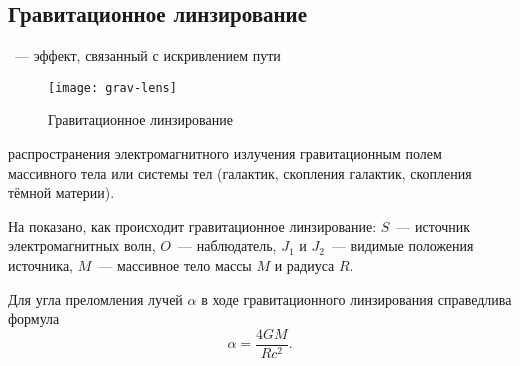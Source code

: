 \subsection{Гравитационное линзирование}
~--- эффект, связанный с искривлением пути
\begin{wrapfigure}[9]{l}{0.35\tw}
    \centering
    \vspace{-1pc}
    \texttt{[image: grav-lens]}
    \caption{Гравитационное линзирование}
    \label{grav-lens}
\end{wrapfigure}
распространения электромагнитного излучения гравитационным полем массивного тела или системы тел (галактик, скопления галактик, скопления тёмной материи).

На  показано, как происходит гравитационное линзирование: $S$~--- источник электромагнитных волн, $O$~--- наблюдатель, $J_1$ и $J_2$~--- видимые положения источника, $M$~--- массивное тело массы $M$ и радиуса $R$.

Для угла преломления лучей $\alpha$ в ходе гравитационного линзирования справедлива формула
\begin{equation}
    \alpha = \frac{4 G M}{R c^2}.
\end{equation}
